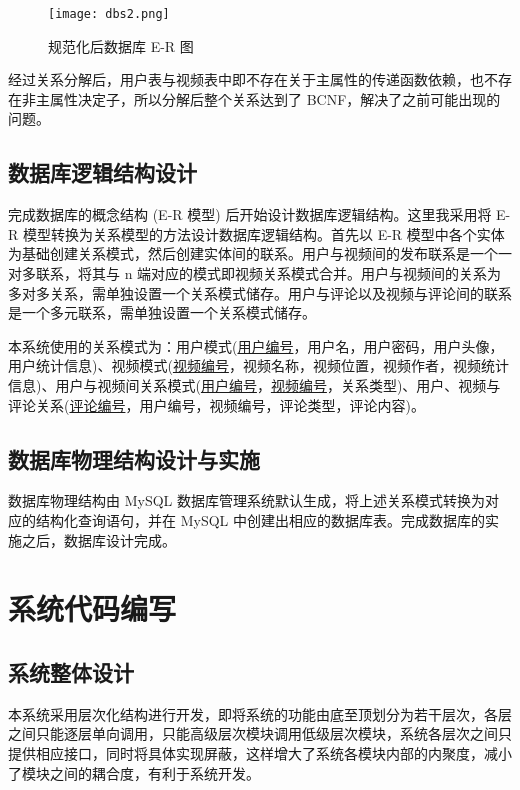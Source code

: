 \begin{figure}[!ht]
    \centering
    \texttt{[image: dbs2.png]}
    \caption{规范化后数据库 E-R 图}
    \label{fig:ER2}
\end{figure}

经过关系分解后，用户表与视频表中即不存在关于主属性的传递函数依赖，也不存在非主属性决定子，所以分解后整个关系达到了 BCNF，解决了之前可能出现的问题。

\subsection{数据库逻辑结构设计}

完成数据库的概念结构 (E-R 模型) 后开始设计数据库逻辑结构。这里我采用将 E-R 模型转换为关系模型的方法设计数据库逻辑结构。首先以 E-R 模型中各个实体为基础创建关系模式，然后创建实体间的联系。用户与视频间的发布联系是一个一对多联系，将其与 n 端对应的模式即视频关系模式合并。用户与视频间的关系为多对多关系，需单独设置一个关系模式储存。用户与评论以及视频与评论间的联系是一个多元联系，需单独设置一个关系模式储存。

本系统使用的关系模式为：用户模式(\uline{用户编号}，用户名，用户密码，用户头像，用户统计信息)、视频模式(\uline{视频编号}，视频名称，视频位置，视频作者，视频统计信息)、用户与视频间关系模式(\uline{用户编号}，\uline{视频编号}，关系类型)、用户、视频与评论关系(\uline{评论编号}，用户编号，视频编号，评论类型，评论内容)。

\subsection{数据库物理结构设计与实施}

数据库物理结构由 MySQL 数据库管理系统默认生成，将上述关系模式转换为对应的结构化查询语句，并在 MySQL 中创建出相应的数据库表。完成数据库的实施之后，数据库设计完成。



\section{系统代码编写}

\subsection{系统整体设计}
本系统采用层次化结构进行开发，即将系统的功能由底至顶划分为若干层次，各层之间只能逐层单向调用，只能高级层次模块调用低级层次模块，系统各层次之间只提供相应接口，同时将具体实现屏蔽，这样增大了系统各模块内部的内聚度，减小了模块之间的耦合度，有利于系统开发。


